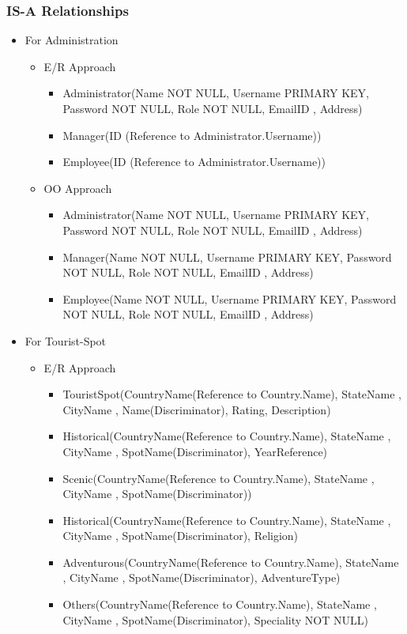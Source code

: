\documentclass[a4paper,11pt]{article}
\begin{document}
\subsubsection{IS-A Relationships}
\begin{itemize}
\item For Administration
\begin{itemize}
\item E/R Approach
\begin{itemize}
\item Administrator(Name NOT NULL, Username PRIMARY KEY, Password NOT NULL, Role NOT NULL, EmailID , Address)
\item Manager(ID (Reference to Administrator.Username))
\item Employee(ID (Reference to Administrator.Username))
\end{itemize}
\item OO Approach
\begin{itemize}
\item Administrator(Name NOT NULL, Username PRIMARY KEY, Password NOT NULL, Role NOT NULL, EmailID , Address)
\item Manager(Name NOT NULL, Username PRIMARY KEY, Password NOT NULL, Role NOT NULL, EmailID , Address)
\item Employee(Name NOT NULL, Username PRIMARY KEY, Password NOT NULL, Role NOT NULL, EmailID , Address)
\end{itemize}
\end{itemize} 
\item For Tourist-Spot
\begin{itemize}
\item E/R Approach
\begin{itemize}
\item TouristSpot(CountryName(Reference to Country.Name), StateName , CityName , Name(Discriminator), Rating, Description)

\item Historical(CountryName(Reference to Country.Name), StateName , CityName , SpotName(Discriminator), YearReference)
\item Scenic(CountryName(Reference to Country.Name), StateName , CityName , SpotName(Discriminator))
\item Historical(CountryName(Reference to Country.Name), StateName , CityName , SpotName(Discriminator), Religion)
\item Adventurous(CountryName(Reference to Country.Name), StateName , CityName , SpotName(Discriminator), AdventureType)
\item Others(CountryName(Reference to Country.Name), StateName , CityName , SpotName(Discriminator), Speciality NOT NULL)


\end{itemize}
\end{itemize}
\end{itemize}
\end{document}
